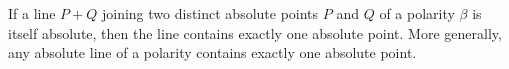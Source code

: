 If a line $P + Q$ joining two distinct absolute points $P$ and $Q$ of a polarity $\beta$ is itself absolute, then the line contains exactly one absolute point. More generally, any absolute line of a polarity contains exactly one absolute point.
